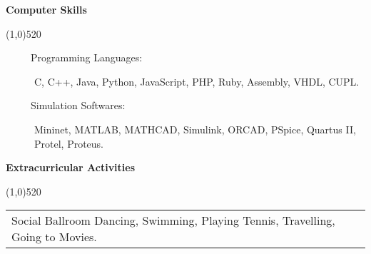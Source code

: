 \documentclass[letterpaper,10pt]{article}
\makeatletter
\newcommand{\heading}[1] {
  {\large
    \begin{minipage}
    {\textwidth}
    {\textbf{#1}}
    \end{minipage}
  }
  \begin{center}
  \vspace{-15pt}
  \line(1,0){520}
  \end{center}
}
\newcommand{\template}[2]{
\begin{tabular*}{7.0in}{l@{\extracolsep{\fill}}r}
		#1 & \textit{#2} \\
\end{tabular*}\vspace{-1pt}}
\makeatother
\begin{document}
\heading{Computer Skills}

\begin{description}
\item[~~~~~Programming Languages:]
C, C++, Java, Python, JavaScript, PHP, Ruby, Assembly, VHDL, CUPL.
\item[~~~~~Simulation Softwares:]
Mininet, MATLAB, MATHCAD, Simulink, ORCAD, PSpice, Quartus II, Protel, Proteus.
\end{description}






\heading{Extracurricular Activities}

\template{Social Ballroom Dancing, Swimming, Playing Tennis, Travelling, Going to Movies.}{~}
\vspace{5pt}
\end{document}
